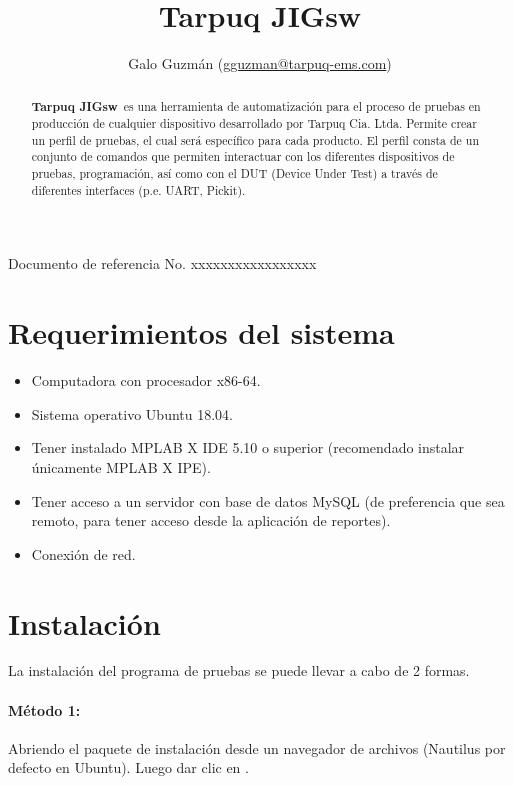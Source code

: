 \documentclass[a4paper,12pt]{refart}
\title{Tarpuq JIGsw}
\author{Galo Guzmán (\url{gguzman@tarpuq-ems.com}) }
\newcommand\tarpuqJIGsw{\textbf{Tarpuq JIGsw}}
\begin{document}
\maketitle

\begin{abstract}
\tarpuqJIGsw\ es una herramienta de automatización para el proceso de pruebas en producción de cualquier dispositivo desarrollado por Tarpuq Cia. Ltda.
Permite crear un perfil de pruebas, el cual será específico para cada producto. El perfil consta de un conjunto de comandos que permiten interactuar con los diferentes dispositivos de pruebas, programación, así como con el DUT (Device Under Test) a través de diferentes interfaces (p.e. UART, Pickit).
\end{abstract}

Documento de referencia No. xxxxxxxxxxxxxxxxx

\newpage

\tableofcontents

\section{Requerimientos del sistema}
\begin{itemize}
\item Computadora con procesador x86-64.
\item Sistema operativo Ubuntu 18.04.
\item Tener instalado MPLAB X IDE 5.10 o superior (recomendado instalar únicamente MPLAB X IPE).
\item Tener acceso a un servidor con base de datos MySQL (de preferencia que sea remoto, para tener acceso desde la aplicación de reportes).
\item Conexión de red.
\end{itemize}

\section{Instalación}
La instalación del programa de pruebas se puede llevar a cabo de 2 formas.

\paragraph{Método 1:}
Abriendo el paquete de instalación  desde un navegador de archivos (Nautilus por defecto en Ubuntu). Luego dar clic en .
\end{document}
